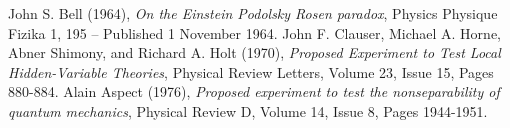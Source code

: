 
\begin{thebibliography}{}
 John S. Bell (1964), \textit{On the Einstein Podolsky Rosen paradox}, Physics Physique Fizika 1, 195 – Published 1 November 1964.        
 John F. Clauser, Michael A. Horne, Abner Shimony, and Richard A. Holt (1970), \textit{Proposed Experiment to Test Local Hidden-Variable Theories}, Physical Review Letters, Volume 23, Issue 15, Pages 880-884.
 Alain Aspect (1976), \textit{Proposed experiment to test the nonseparability of quantum mechanics}, Physical Review D, Volume 14, Issue 8, Pages 1944-1951.
\end{thebibliography}

